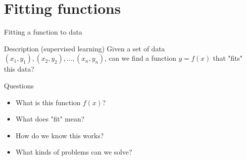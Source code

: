 \section{Fitting functions}

\begin{frame}{Fitting a function to data}
		\begin{block}{Description (supervised learning)}
		Given a set of data $(x_1,y_1),(x_2,y_2), \dots, (x_n,y_n)$, can 
		we find a function $y=f(x)$ that "fits" this data? 		
		\end{block}		
		\begin{block}{Questions}
			\begin{itemize}
				\item What is this function $f(x)$?
				\item What does "fit" mean? 
				\item How do we know this works? 
				\item What kinds of problems can we solve? 
			\end{itemize}
		\end{block}
\end{frame}


